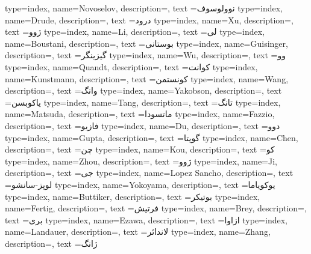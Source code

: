 {
    type=index,
    name={Novoselov},
    description={},
    text ={نوولوسوف}
}
{
    type=index,
    name={Drude},
    description={},
    text ={درود}
}
{
    type=index,
    name={Xu},
    description={},
    text ={ژوو}
}
{
    type=index,
    name={Li},
    description={},
    text ={لی}
}
{
    type=index,
    name={Boustani},
    description={},
    text ={بوستانی}
}
{
    type=index,
    name={Guisinger},
    description={},
    text ={گیزینگر}
}
{
    type=index,
    name={Wu},
    description={},
    text ={وو}
}
{
    type=index,
    name={Quandt},
    description={},
    text ={کوانت}
}
{
    type=index,
    name={Kunstmann},
    description={},
    text ={کونستمن}
}
{
    type=index,
    name={Wang},
    description={},
    text ={وانگ}
}
{
    type=index,
    name={Yakobson},
    description={},
    text ={یاکوبسن}
}
{
    type=index,
    name={Tang},
    description={},
    text ={تانگ}
}
{
    type=index,
    name={Matsuda},
    description={},
    text ={ماتسودا}
}
{
    type=index,
    name={Fazzio},
    description={},
    text ={فازیو}
}
{
    type=index,
    name={Du},
    description={},
    text ={دوو}
}
{
    type=index,
    name={Gupta},
    description={},
    text ={گوپتا}
}
{
    type=index,
    name={Chen},
    description={},
    text ={چن}
}
{
    type=index,
    name={Kou},
    description={},
    text ={کو}
}
{
    type=index,
    name={Zhou},
    description={},
    text ={ژوو}
}
{
    type=index,
    name={Ji},
    description={},
    text ={جی}
}
{
    type=index,
    name={Lopez Sancho},
    description={},
    text ={لوپز-سانشو}
}
{
    type=index,
    name={Yokoyama},
    description={},
    text ={یوکویاما}
}
{
    type=index,
    name={Buttiker},
    description={},
    text ={بوتیکر}
}
{
    type=index,
    name={Fertig},
    description={},
    text ={فرتیش}
}
{
    type=index,
    name={Brey},
    description={},
    text ={بری}
}
{
    type=index,
    name={Ezawa},
    description={},
    text ={ازاوا}
}
{
    type=index,
    name={Landauer},
    description={},
    text ={لاندائر}
}
{
    type=index,
    name={Zhang},
    description={},
    text ={ژانگ}
}